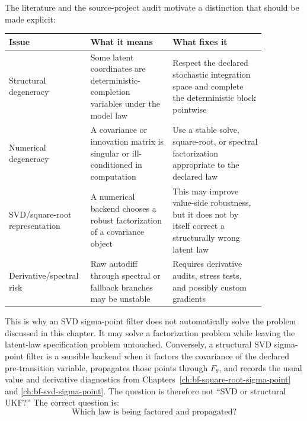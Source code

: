 The literature and the source-project audit motivate a distinction that should
be made explicit:
\begin{center}
\begin{tabular}{p{0.22\linewidth}p{0.30\linewidth}p{0.34\linewidth}}
\toprule
\textbf{Issue} & \textbf{What it means} & \textbf{What fixes it}\\
\midrule
Structural degeneracy & Some latent coordinates are deterministic-completion variables under the model law & Respect the declared stochastic integration space and complete the deterministic block pointwise\\
Numerical degeneracy & A covariance or innovation matrix is singular or ill-conditioned in computation & Use a stable solve, square-root, or spectral factorization appropriate to the declared law\\
SVD/square-root representation & A numerical backend chooses a robust factorization of a covariance object & This may improve value-side robustness, but it does not by itself correct a structurally wrong latent law\\
Derivative/spectral risk & Raw autodiff through spectral or fallback branches may be unstable & Requires derivative audits, stress tests, and possibly custom gradients\\
\bottomrule
\end{tabular}
\end{center}
This is why an SVD sigma-point filter does not automatically solve the problem
discussed in this chapter.  It may solve a factorization problem while leaving
the latent-law specification problem untouched.  Conversely, a structural SVD
sigma-point filter is a sensible backend when it factors the covariance of the
declared pre-transition variable, propagates those points through
$F_\theta$, and records the usual value and derivative diagnostics from
Chapters~\ref{ch:bf-square-root-sigma-point} and
\ref{ch:bf-svd-sigma-point}.  The question is therefore not
``SVD or structural UKF?''  The correct question is:
\begin{equation}
  \text{Which law is being factored and propagated?}
\end{equation}

